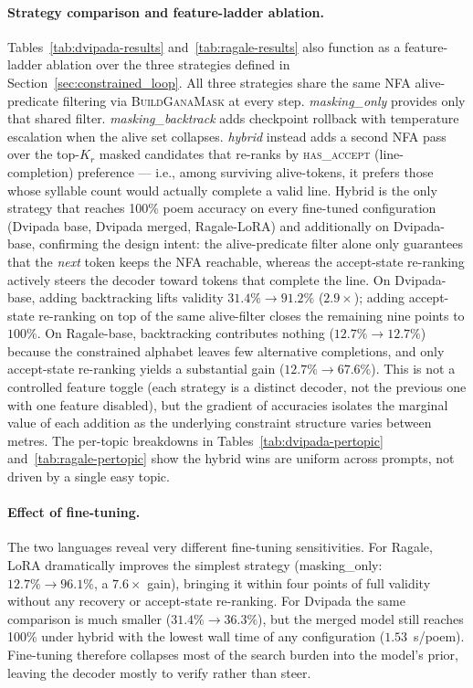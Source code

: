 \documentclass[11pt]{article}
\begin{document}
\paragraph{Strategy comparison and feature-ladder ablation.}
Tables~\ref{tab:dvipada-results} and~\ref{tab:ragale-results} also
function as a feature-ladder ablation over the three strategies
defined in Section~\ref{sec:constrained_loop}. All three strategies
share the same NFA alive-predicate filtering via
\textsc{BuildGanaMask} at every step. \textit{masking\_only} provides
only that shared filter. \textit{masking\_backtrack} adds checkpoint
rollback with temperature escalation when the alive set collapses.
\textit{hybrid} instead adds a second NFA pass over the top-$K_r$
masked candidates that re-ranks by \textsc{has\_accept} (line-completion)
preference --- i.e., among surviving alive-tokens, it prefers those
whose syllable count would actually complete a valid line. Hybrid is
the only strategy that reaches 100\% poem accuracy on every fine-tuned
configuration (Dvipada base, Dvipada merged, Ragale-LoRA) and
additionally on Dvipada-base, confirming the design intent: the
alive-predicate filter alone only guarantees that the \emph{next}
token keeps the NFA reachable, whereas the accept-state re-ranking
actively steers the decoder toward tokens that complete the line. On
Dvipada-base, adding backtracking lifts validity
$31.4\% \to 91.2\%$ ($2.9\times$); adding accept-state re-ranking on
top of the same alive-filter closes the remaining nine points to
$100\%$. On Ragale-base, backtracking contributes nothing
($12.7\% \to 12.7\%$) because the constrained alphabet leaves few
alternative completions, and only accept-state re-ranking yields a
substantial gain ($12.7\% \to 67.6\%$). This is not a controlled
feature toggle (each strategy is a distinct decoder, not the previous
one with one feature disabled), but the gradient of accuracies
isolates the marginal value of each addition as the underlying
constraint structure varies between metres. The per-topic breakdowns
in Tables~\ref{tab:dvipada-pertopic} and~\ref{tab:ragale-pertopic}
show the hybrid wins are uniform across prompts, not driven by a
single easy topic.

\paragraph{Effect of fine-tuning.}
The two languages reveal very different fine-tuning sensitivities. For
Ragale, LoRA dramatically improves the simplest strategy
(masking\_only: $12.7\% \to 96.1\%$, a $7.6\times$ gain), bringing it
within four points of full validity without any recovery or accept-state
re-ranking. For Dvipada the same comparison is much smaller
($31.4\% \to 36.3\%$), but the merged model still reaches 100\% under
hybrid with the lowest wall time of any configuration
($1.53$~s/poem). Fine-tuning therefore collapses most of the search
burden into the model's prior, leaving the decoder mostly to verify
rather than steer.
\end{document}
